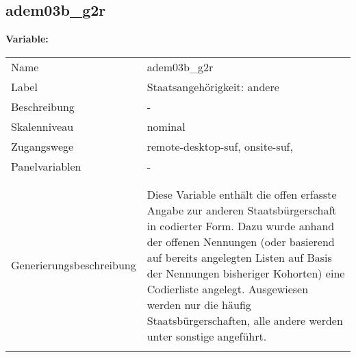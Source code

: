 	
	
	\subsection{adem03b\_g2r}
	\label{subSection:adem03b_g2r}

	\noindent\textbf{Variable:}\\
		\begin{tabular}{lL{11.3cm}}
			\label{tableVariable:adem03b_g2r}
			Name & adem03b\_g2r \\
			Label & Staatsangehörigkeit: andere \\
			Beschreibung & - \\
			Skalenniveau & nominal \\
			Zugangswege &
				remote-desktop-suf,
				onsite-suf,
 \\
			Panelvariablen & -
			 \\
			 \\
 \\
					Generierungsbeschreibung & Diese Variable enthält die offen erfasste Angabe zur anderen Staatsbürgerschaft in codierter Form. Dazu wurde anhand der offenen Nennungen (oder basierend auf bereits angelegten Listen auf Basis der Nennungen bisheriger Kohorten) eine Codierliste angelegt. Ausgewiesen werden nur die häufig Staatsbürgerschaften, alle andere werden unter sonstige angeführt.
				 \\	
			 \\
		\end{tabular}






